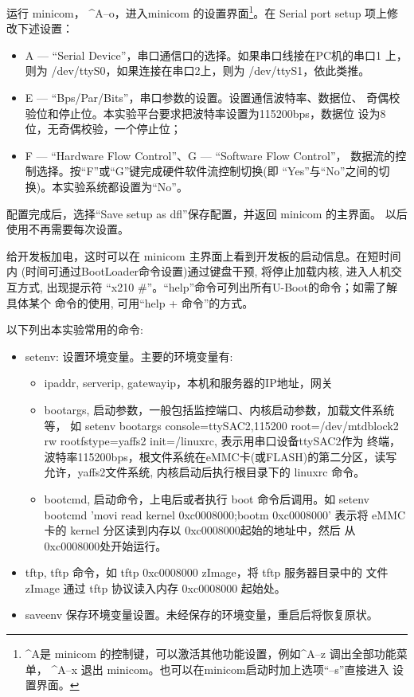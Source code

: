 运行 minicom， \^{}A--o，进入minicom 的设置界面\footnote{\^{}A是
minicom 的控制键，可以激活其他功能设置，例如\^{}A--z 调出全部功能菜单，
\^{}A--x 退出 minicom。也可以在minicom启动时加上选项``--s''直接进入
设置界面。}。在 Serial port setup 项上修改下述设置：
\begin{itemize}
  \item A --- ``Serial Device''，串口通信口的选择。如果串口线接在PC机的串口1
		上，则为 /dev/ttyS0，如果连接在串口2上，则为 /dev/ttyS1，依此类推。
  \item E --- ``Bps/Par/Bits''，串口参数的设置。设置通信波特率、数据位、
		奇偶校验位和停止位。本实验平台要求把波特率设置为115200bps，数据位
		设为8位，无奇偶校验，一个停止位；
  \item F --- ``Hardware Flow Control''、G --- ``Software Flow Control''，
		数据流的控制选择。按``F''或``G''键完成硬件软件流控制切换(即
		``Yes''与``No''之间的切换)。本实验系统都设置为``No''。
\end{itemize}

配置完成后，选择``Save setup as dfl''保存配置，并返回 minicom 的主界面。
以后使用不再需要每次设置。

给开发板加电，这时可以在 minicom 主界面上看到开发板的启动信息。在短时间内
(时间可通过BootLoader命令设置)通过键盘干预, 将停止加载内核, 进入人机交互方式,
出现提示符 ``x210 \#''。``help''命令可列出所有U-Boot的命令；如需了解具体某个
命令的使用, 可用``help + 命令''的方式。

	以下列出本实验常用的命令:
\begin{itemize}
  \item setenv: 设置环境变量。主要的环境变量有:
  \begin{itemize}
    \item ipaddr, serverip, gatewayip，本机和服务器的IP地址，网关
    \item bootargs, 启动参数，一般包括监控端口、内核启动参数，加载文件系统等，
		如 setenv bootargs console=ttySAC2,115200 root=/dev/mtdblock2 rw
             rootfstype=yaffs2 init=/linuxrc, 表示用串口设备ttySAC2作为
		终端，波特率115200bps，根文件系统在eMMC卡(或FLASH)的第二分区，读写
		允许，yaffs2文件系统, 内核启动后执行根目录下的 linuxrc 命令。
	\item bootcmd, 启动命令，上电后或者执行 boot 命令后调用。如
		setenv bootcmd 'movi read kernel 0xc0008000;bootm 0xc0008000'
		表示将 eMMC 卡的 kernel 分区读到内存以 0xc0008000起始的地址中，然后
		从0xc0008000处开始运行。
  \end{itemize}
  \item tftp, tftp 命令，如 tftp 0xc0008000 zImage，将 tftp 服务器目录中的
        文件 zImage 通过 tftp 协议读入内存 0xc0008000 起始处。
  \item saveenv 保存环境变量设置。未经保存的环境变量，重启后将恢复原状。
\end{itemize}


